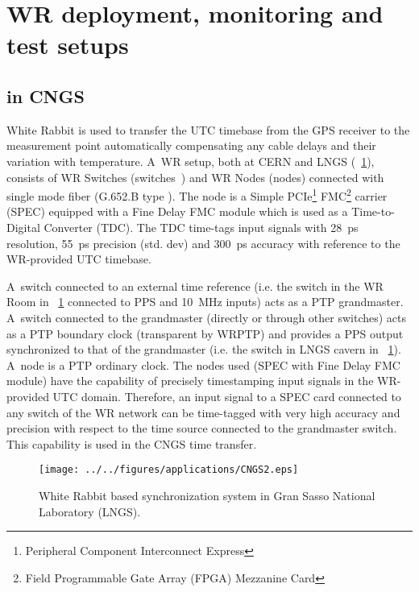 \section{WR deployment, monitoring and test setups}
\label{sec:deplAndMeas}
\subsection{ in CNGS} 

White Rabbit is used to transfer the UTC timebase from the GPS receiver to the 
measurement point automatically compensating any cable delays and their variation with temperature. 
A~WR setup, both at CERN and LNGS (\figurename~\ref{fig:wrLNGStiming}), consists of WR Switches 
(switches~\cite{biblio:WRswitch}) 
and WR Nodes (nodes) connected with single mode fiber (G.652.B type \cite{biblio:Draka}). %
The node is a Simple PCIe\footnote{Peripheral Component Interconnect Express} 
FMC\footnote{Field Programmable Gate Array (FPGA) Mezzanine Card} carrier (SPEC) \cite{biblio:spec}
equipped with a Fine Delay FMC module \cite{biblio:fineDelay} which is used as 
a Time-to-Digital Converter (TDC). The TDC time-tags input signals with 28~ps 
resolution, 55~ps precision (std. dev) and 300~ps accuracy \cite{biblio:fineDelay}
with reference to the WR-provided UTC timebase.

A~switch connected to an external time reference (i.e. the switch in the WR Room in 
\figurename~\ref{fig:wrLNGStiming} connected to PPS and 10~MHz inputs) acts as a 
PTP grandmaster. A~switch connected to the grandmaster (directly or through other switches) 
acts as a PTP boundary clock (transparent  by WRPTP)
and provides a PPS output synchronized to that of the grandmaster (i.e. the switch in LNGS cavern in 
\figurename~\ref{fig:wrLNGStiming}). 
A~node is a PTP ordinary clock. The nodes used (SPEC with Fine Delay FMC module) 
have the capability of precisely timestamping input signals in the WR-provided UTC domain. 
Therefore, an input signal to a SPEC card connected to any switch of the WR network can be 
time-tagged with very high accuracy and precision with respect to the 
time source connected to the grandmaster switch. This capability is used in the CNGS time transfer.

\begin{figure}[!t]
\centering
\texttt{[image: ../../figures/applications/CNGS2.eps]}
\caption{White Rabbit based synchronization system in Gran Sasso National Laboratory (LNGS).}
\label{fig:wrLNGStiming}
\end{figure}

